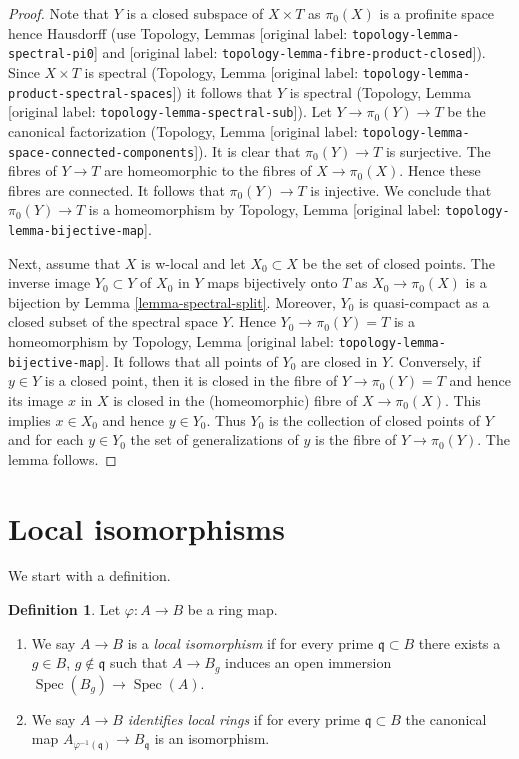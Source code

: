 \documentclass[10pt,a4paper]{article}
\theoremstyle{plain}
\theoremstyle{definition}
\newtheorem{definition}[subsection]{Definition}
\theoremstyle{remark}
\numberwithin{equation}{subsection}
\def\Spec{\mathop{\mathrm{Spec}}}
\begin{document}
\begin{proof}
Note that $Y$ is a closed subspace of $X \times T$ as $\pi_0(X)$
is a profinite space hence Hausdorff
(use Topology, Lemmas \textnormal{[original label: \nolinkurl{topology-lemma-spectral-pi0}]} and
\textnormal{[original label: \nolinkurl{topology-lemma-fibre-product-closed}]}).
Since $X \times T$ is spectral
(Topology, Lemma \textnormal{[original label: \nolinkurl{topology-lemma-product-spectral-spaces}]})
it follows that $Y$ is spectral
(Topology, Lemma \textnormal{[original label: \nolinkurl{topology-lemma-spectral-sub}]}).
Let $Y \to \pi_0(Y) \to T$ be the canonical factorization
(Topology, Lemma \textnormal{[original label: \nolinkurl{topology-lemma-space-connected-components}]}).
It is clear that $\pi_0(Y) \to T$ is surjective.
The fibres of $Y \to T$ are homeomorphic to the fibres of
$X \to \pi_0(X)$. Hence these fibres are connected. It follows
that $\pi_0(Y) \to T$ is injective. We conclude that $\pi_0(Y) \to T$
is a homeomorphism by
Topology, Lemma \textnormal{[original label: \nolinkurl{topology-lemma-bijective-map}]}.

\medskip\noindent
Next, assume that $X$ is w-local and let $X_0 \subset X$ be the
set of closed points. The inverse image $Y_0 \subset Y$ of $X_0$ in
$Y$ maps bijectively onto $T$ as $X_0 \to \pi_0(X)$ is a bijection
by Lemma \ref{lemma-spectral-split}. Moreover, $Y_0$ is quasi-compact
as a closed subset of the spectral space $Y$. Hence
$Y_0 \to \pi_0(Y) = T$ is a homeomorphism by
Topology, Lemma \textnormal{[original label: \nolinkurl{topology-lemma-bijective-map}]}.
It follows that all points of $Y_0$ are closed in $Y$.
Conversely, if $y \in Y$ is a closed point, then
it is closed in the fibre of $Y \to \pi_0(Y) = T$
and hence its image $x$ in $X$ is closed in the (homeomorphic) fibre of
$X \to \pi_0(X)$. This implies $x \in X_0$ and hence $y \in Y_0$.
Thus $Y_0$ is the collection of closed points of $Y$
and for each $y \in Y_0$ the set of generalizations of $y$ is
the fibre of $Y \to \pi_0(Y)$. The lemma follows.
\end{proof}




\section{Local isomorphisms}
\label{section-local-isomorphism}

\noindent
We start with a definition.

\begin{definition}
\label{definition-local-isomorphism}
Let $\varphi : A \to B$ be a ring map.
\begin{enumerate}
\item We say $A \to B$ is a {\it local isomorphism} if for every prime
$\mathfrak q \subset B$ there exists a $g \in B$, $g \not \in \mathfrak q$
such that $A \to B_g$ induces an open immersion $\Spec(B_g) \to \Spec(A)$.
\item We say $A \to B$ {\it identifies local rings} if for every prime
$\mathfrak q \subset B$ the canonical map
$A_{\varphi^{-1}(\mathfrak q)} \to B_\mathfrak q$ is an isomorphism.
\end{enumerate}
\end{definition}
\end{document}
